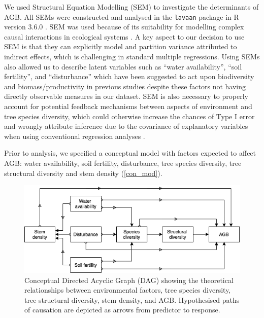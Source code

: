 \documentclass[11pt,a4paper]{article}
\begin{document}
We used Structural Equation Modelling (SEM) to investigate the determinants of AGB. All SEMs were constructed and analysed in the \verb|lavaan| package \citep{lavaan} in R version 3.6.0 \citep{R2019}. SEM was used because of its suitability for modelling complex causal interactions in ecological systems \citep{Lee2007}. A key aspect to our decision to use SEM is that they can explicitly model and partition variance attributed to indirect effects, which is challenging in standard multiple regressions. Using SEMs also allowed us to describe latent variables such as ``water availability'', ``soil fertility'', and ``disturbance'' which have been suggested to act upon biodiversity and biomass/productivity in previous studies despite these factors not having directly observable measures in our dataset. SEM is also necessary to properly account for potential feedback mechanisms between aspects of environment and tree species diversity, which could otherwise increase the chances of Type I error and wrongly attribute inference due to the covariance of explanatory variables when using conventional regression analyses \citep{Nachtigall2003}.

Prior to analysis, we specified a conceptual model with factors expected to affect AGB: water availability, soil fertility, disturbance, tree species diversity, tree structural diversity and stem density (\autoref{con_mod}). 

\begin{figure}[H]
\centering
\includegraphics[width=\textwidth]{concept}
	\caption{Conceptual Directed Acyclic Graph (DAG) showing the theoretical relationships between environmental factors, tree species diversity, tree structural diversity, stem density, and AGB. Hypothesised paths of causation are depicted as arrows from predictor to response.}
	\label{con_mod}
\end{figure}
\end{document}
